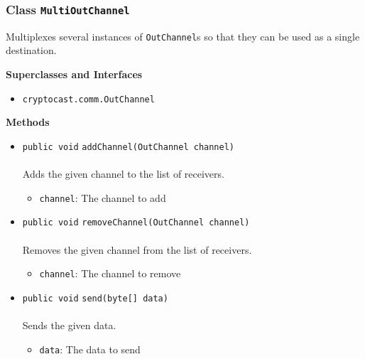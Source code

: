 \subsubsection{Class \lstinline|MultiOutChannel|}
Multiplexes several instances  of \lstinline|OutChannel|s so that they can be used as a single
 destination. \\
\noindent\begin{minipage}[t]{5cm}
\vspace{0.3em}
\hspace*{2em}
\vspace{0.3em}
\end{minipage}



\textbf{\sffamily Superclasses and Interfaces}
\begin{itemize}
\item \lstinline|cryptocast.comm.OutChannel|
\end{itemize}



\textbf{\sffamily Methods}
\begin{itemize}
\item \lstinline|public void| \lstinline|addChannel|\lstinline|(OutChannel channel)|\\ \\[-0.6em]
Adds the given channel to the list of receivers.
\begin{itemize}
\item \lstinline|channel|: The channel to add
\end{itemize}



\item \lstinline|public void| \lstinline|removeChannel|\lstinline|(OutChannel channel)|\\ \\[-0.6em]
Removes the given channel from the list of receivers.
\begin{itemize}
\item \lstinline|channel|: The channel to remove
\end{itemize}



\item \lstinline|public void| \lstinline|send|\lstinline|(byte[] data)|\\ \\[-0.6em]
Sends the given data.
\begin{itemize}
\item \lstinline|data|: The data to send
\end{itemize}



\end{itemize}

